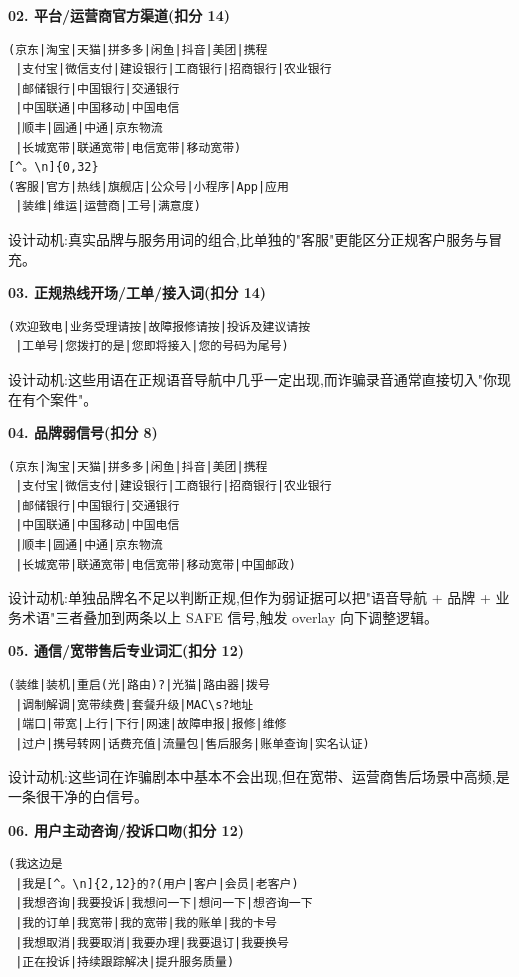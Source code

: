 \documentclass[UTF8,a4paper,12pt]{ctexart}
\begin{document}
\textbf{02. 平台/运营商官方渠道(扣分 14)}

\begin{lstlisting}[language={}]
(京东|淘宝|天猫|拼多多|闲鱼|抖音|美团|携程
 |支付宝|微信支付|建设银行|工商银行|招商银行|农业银行
 |邮储银行|中国银行|交通银行
 |中国联通|中国移动|中国电信
 |顺丰|圆通|中通|京东物流
 |长城宽带|联通宽带|电信宽带|移动宽带)
[^。\n]{0,32}
(客服|官方|热线|旗舰店|公众号|小程序|App|应用
 |装维|维运|运营商|工号|满意度)
\end{lstlisting}

设计动机:真实品牌与服务用词的组合,比单独的"客服"更能区分正规客户服务与冒充。

\textbf{03. 正规热线开场/工单/接入词(扣分 14)}

\begin{lstlisting}[language={}]
(欢迎致电|业务受理请按|故障报修请按|投诉及建议请按
 |工单号|您拨打的是|您即将接入|您的号码为尾号)
\end{lstlisting}

设计动机:这些用语在正规语音导航中几乎一定出现,而诈骗录音通常直接切入"你现在有个案件"。

\textbf{04. 品牌弱信号(扣分 8)}

\begin{lstlisting}[language={}]
(京东|淘宝|天猫|拼多多|闲鱼|抖音|美团|携程
 |支付宝|微信支付|建设银行|工商银行|招商银行|农业银行
 |邮储银行|中国银行|交通银行
 |中国联通|中国移动|中国电信
 |顺丰|圆通|中通|京东物流
 |长城宽带|联通宽带|电信宽带|移动宽带|中国邮政)
\end{lstlisting}

设计动机:单独品牌名不足以判断正规,但作为弱证据可以把"语音导航 + 品牌 + 业务术语"三者叠加到两条以上 SAFE 信号,触发 overlay 向下调整逻辑。

\textbf{05. 通信/宽带售后专业词汇(扣分 12)}

\begin{lstlisting}[language={}]
(装维|装机|重启(光|路由)?|光猫|路由器|拨号
 |调制解调|宽带续费|套餐升级|MAC\s?地址
 |端口|带宽|上行|下行|网速|故障申报|报修|维修
 |过户|携号转网|话费充值|流量包|售后服务|账单查询|实名认证)
\end{lstlisting}

设计动机:这些词在诈骗剧本中基本不会出现,但在宽带、运营商售后场景中高频,是一条很干净的白信号。

\textbf{06. 用户主动咨询/投诉口吻(扣分 12)}

\begin{lstlisting}[language={}]
(我这边是
 |我是[^。\n]{2,12}的?(用户|客户|会员|老客户)
 |我想咨询|我要投诉|我想问一下|想问一下|想咨询一下
 |我的订单|我宽带|我的宽带|我的账单|我的卡号
 |我想取消|我要取消|我要办理|我要退订|我要换号
 |正在投诉|持续跟踪解决|提升服务质量)
\end{lstlisting}
\end{document}

